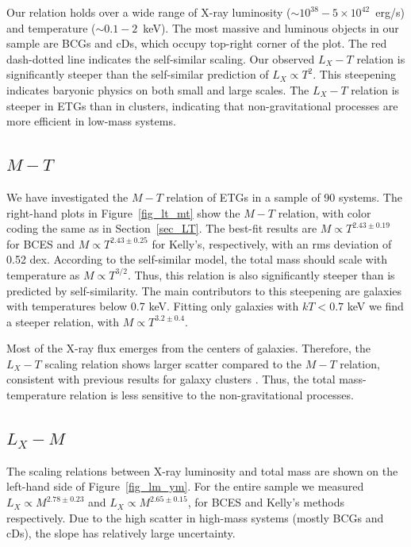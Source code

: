 \documentclass[iop]{emulateapj}
\begin{document}
Our relation holds over a wide range of X-ray luminosity ($\sim10^{38}-5\times 10^{42}$~erg/s) and temperature ($\sim0.1-2$~keV). The most massive and luminous objects in our sample are BCGs and cDs, which occupy top-right corner of the plot. The red dash-dotted line indicates the self-similar scaling. Our observed $L_X-T$ relation is significantly steeper than the self-similar prediction of $L_X \propto T^2$.  This steepening indicates baryonic physics on both small and large scales. The $L_X-T$ relation is steeper in ETGs than in clusters, indicating that non-gravitational processes are more efficient in low-mass systems. 

\subsection{$M-T$}\label{sec_MT}

We have investigated the $M-T$ relation of ETGs in a sample of 90 systems. The right-hand plots in Figure~\ref{fig_lt_mt} show the $M-T$ relation, with color coding the same as in Section~\ref{sec_LT}. The best-fit results are $M \propto T^{2.43\pm0.19}$ for BCES and $M \propto T^{2.43\pm0.25}$ for Kelly's, respectively, with an rms deviation of 0.52 dex. According to the self-similar model, the total mass should scale with temperature as $M \propto T^{3/2}$. Thus, this relation is also significantly steeper than is predicted by self-similarity. The main contributors to this steepening are galaxies with temperatures below 0.7 keV. Fitting only galaxies with $kT < 0.7$ keV we find a steeper relation, with $M \propto T^{3.2\pm0.4}$.

Most of the X-ray flux emerges from the centers of galaxies.  Therefore,  the $L_X-T$ scaling relation shows larger scatter compared to the $M-T$ relation, consistent with previous results for galaxy clusters \citep{Markevitch:98, Arnaud:99, Pratt:09, Maughan:12}. Thus, the total mass-temperature relation is less sensitive to the non-gravitational processes. 

\subsection{$L_X-M$}\label{sec_LM}

The scaling relations between X-ray luminosity and total mass are shown on the left-hand side of Figure~\ref{fig_lm_ym}. For the entire sample we measured $L_X \propto M^{2.78\pm0.23}$ and $L_X \propto M^{2.65\pm0.15}$, for BCES and Kelly's methods respectively. Due to the high scatter in high-mass systems (mostly BCGs and cDs), the slope has relatively large uncertainty.
\end{document}
